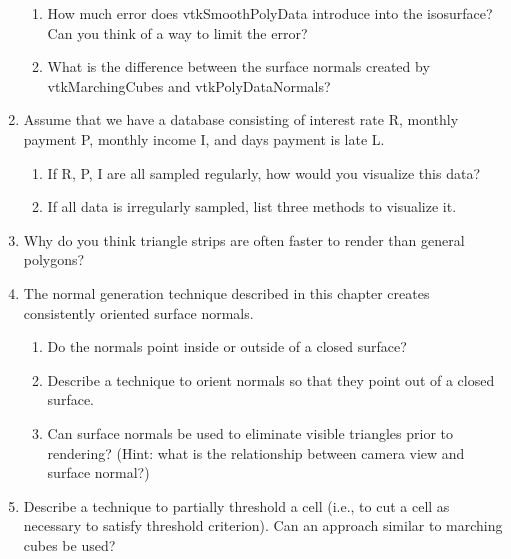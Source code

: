 \begin{enumerate}
\begin{enumerate}
    \item How much error does vtkSmoothPolyData introduce into the isosurface? Can you think of a way to limit the error?

    \item What is the difference between the surface normals created by vtkMarchingCubes and vtkPolyDataNormals?

    \end{enumerate}

\item Assume that we have a database consisting of interest rate R, monthly payment P, monthly income I, and days payment is late L.

    \begin{enumerate}

    \item If R, P, I are all sampled regularly, how would you visualize this data?

    \item If all data is irregularly sampled, list three methods to visualize it.

    \end{enumerate}

\item Why do you think triangle strips are often faster to render than general polygons?

\item The normal generation technique described in this chapter creates consistently oriented surface normals.

    \begin{enumerate}

    \item Do the normals point inside or outside of a closed surface?

    \item Describe a technique to orient normals so that they point out of a closed surface.

    \item Can surface normals be used to eliminate visible triangles prior to rendering? (Hint: what is the relationship between camera view and surface normal?)

    \end{enumerate}

\item Describe a technique to partially threshold a cell (i.e., to cut a cell as necessary to satisfy threshold criterion). Can an approach similar to marching cubes be used?


\end{enumerate}
